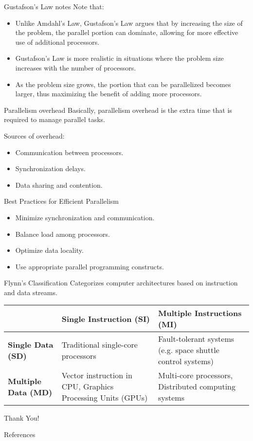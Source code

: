 \documentclass{beamer}
\begin{document}
\begin{frame}{Gustafson's Law notes}
  Note that:
  \begin{itemize}
    \item Unlike Amdahl's Law, Gustafson's Law argues that by increasing the size of the problem, the parallel portion can dominate, allowing for more effective use of additional processors.
    \item Gustafson's Law is more realistic in situations where the problem size increases with the number of processors.
    \item As the problem size grows, the portion that can be parallelized becomes larger, thus maximizing the benefit of adding more processors.
  \end{itemize}
\end{frame}

\begin{frame}{Parallelism overhead}
  Basically, parallelism overhead is the extra time that is required to manage parallel tasks.

  Sources of overhead:
  \begin{itemize}
    \item Communication between processors.
    \item Synchronization delays.
    \item Data sharing and contention.
  \end{itemize}
\end{frame}

\begin{frame}{Best Practices for Efficient Parallelism}
  \begin{itemize}
    \item Minimize synchronization and communication.
    \item Balance load among processors.
    \item Optimize data locality.
    \item Use appropriate parallel programming constructs.
  \end{itemize}
\end{frame}

\begin{frame}{Flynn's Classification}
  Categorizes computer architectures based on instruction and data streams.
  \begin{tabular}{| p{2.1cm} | p{4.2 cm} | p{4.2 cm} |}
    \hline
    & \textbf{Single Instruction (SI)} & \textbf{Multiple Instructions (MI)} \\
    \hline
    \textbf{Single Data (SD)} & Traditional single-core processors & Fault-tolerant systems (e.g. space shuttle control systems) \\
    \hline
    \textbf{Multiple Data (MD)} & Vector instruction in CPU, Graphics Processing Units (GPUs) & Multi-core processors, Distributed computing systems \\
    \hline
  \end{tabular}
\end{frame}

\begin{frame}
    \centering
    \Huge{Thank You!}
\end{frame}

\begin{frame}{References}
\end{frame}
\end{document}
